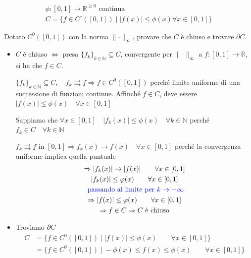 \begin{exbar}
\begin{example}
	\begin{gather*}
		\phi: [0,1] \rightarrow \mathbb{R}^{\geq 0} \text{ continua}
		\\
		C = \{ f \in C^\circ ([0,1]) \; \big| \; |f(x)| \leq \phi(x) \forall x \in [0,1] \}
	\end{gather*}

	Dotato $C^0 ([0,1])$ con la norma $\parallel \cdot \parallel_\infty$, provare che $C$ è chiuso e trovare $\partial C$.
	\begin{itemize}
		\item $C$ è chiuso $\iff$ presa $\{f_k\}_{k \in \mathbb{N}} \subseteq C$, convergente per $\parallel \cdot \parallel_\infty$ a $f:[0,1] \rightarrow \mathbb{R}$, si ha che $f \in C$.
		
		$\{ f_k \}_{k \in \mathbb{N}} \subseteq C, \quad f_k \rightrightarrows f \Rightarrow f \in C^0([0,1])$ perché limite uniforme di una successione di funzioni continue. Affinché $f \in C$, deve essere $|f(x)| \leq \phi(x) \quad \forall x \in [0,1]$
		
		Sappiamo che $\forall x \in [0,1] \quad |f_k(x)| \leq \phi(x) \quad \forall k \in \mathbb{N}$ perché $f_k \in C \quad \forall k \in \mathbb{N}$
		
		$f_k \rightrightarrows f$ in $[0,1] \Rightarrow f_k(x) \rightarrow f(x) \quad \forall x \in [0,1] $ perché la convergenza uniforme implica quella puntuale 
		\begin{gather*}
			\Rightarrow |f_k(x)| \rightarrow |f(x)| \qquad \forall x \in [0,1]
			\\
			|f_k(x)| \leq \phi(x) \qquad \forall x \in [0,1]
			\\
			\color{blue}{\text{ passando al limite per } k \to +\infty } 
			\\
			\Rightarrow |f(x)| \leq \phi(x) \qquad \forall x \in [0,1]
			\\
			\Rightarrow f \in C \Rightarrow C \text{ è chiuso}
		\end{gather*}

		\item Troviamo $\partial C$
		\begin{align*}
			C 
			&= \{ f \in C^0 ([0,1]) \; \big| \; |f(x)| \leq \phi(x) \qquad \forall x \in [0,1] \} 
			\\
			&= \{ f \in C^0 ([0,1]) \; \big| \; -\phi(x) \leq f(x) \leq \phi(x) \qquad \forall x \in [0,1] \}
		\end{align*}


\end{itemize}
\end{example}
\end{exbar}
